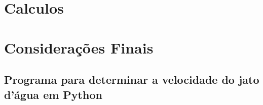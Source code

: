 \documentclass[a4paper, 12pt, openany, oneside, brazil]{abntex2} %
\begin{document}
\chapter{Calculos}

\chapter*[Considerações Finais]{Considerações Finais}


% 



\begin{apendicesenv}


\chapter{Programa para determinar a velocidade do jato d'água em Python}
\label{ap-python}
 


\end{apendicesenv}
\end{document}
